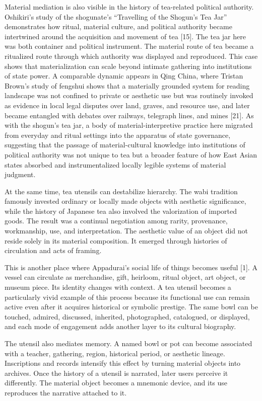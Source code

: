 \documentclass[11pt,a4paper]{article}
\begin{document}
Material mediation is also visible in the history of tea-related political authority. Oshikiri's study of the shogunate's ``Travelling of the Shogun's Tea Jar'' demonstrates how ritual, material culture, and political authority became intertwined around the acquisition and movement of tea [15]. The tea jar here was both container and political instrument. The material route of tea became a ritualized route through which authority was displayed and reproduced. This case shows that materialization can scale beyond intimate gathering into institutions of state power. A comparable dynamic appears in Qing China, where Tristan Brown's study of fengshui shows that a materially grounded system for reading landscape was not confined to private or aesthetic use but was routinely invoked as evidence in local legal disputes over land, graves, and resource use, and later became entangled with debates over railways, telegraph lines, and mines [21]. As with the shogun's tea jar, a body of material-interpretive practice here migrated from everyday and ritual settings into the apparatus of state governance, suggesting that the passage of material-cultural knowledge into institutions of political authority was not unique to tea but a broader feature of how East Asian states absorbed and instrumentalized locally legible systems of material judgment.

At the same time, tea utensils can destabilize hierarchy. The wabi tradition famously invested ordinary or locally made objects with aesthetic significance, while the history of Japanese tea also involved the valorization of imported goods. The result was a continual negotiation among rarity, provenance, workmanship, use, and interpretation. The aesthetic value of an object did not reside solely in its material composition. It emerged through histories of circulation and acts of framing.

This is another place where Appadurai's social life of things becomes useful [1]. A vessel can circulate as merchandise, gift, heirloom, ritual object, art object, or museum piece. Its identity changes with context. A tea utensil becomes a particularly vivid example of this process because its functional use can remain active even after it acquires historical or symbolic prestige. The same bowl can be touched, admired, discussed, inherited, photographed, catalogued, or displayed, and each mode of engagement adds another layer to its cultural biography.

The utensil also mediates memory. A named bowl or pot can become associated with a teacher, gathering, region, historical period, or aesthetic lineage. Inscriptions and records intensify this effect by turning material objects into archives. Once the history of a utensil is narrated, later users perceive it differently. The material object becomes a mnemonic device, and its use reproduces the narrative attached to it.
\end{document}
